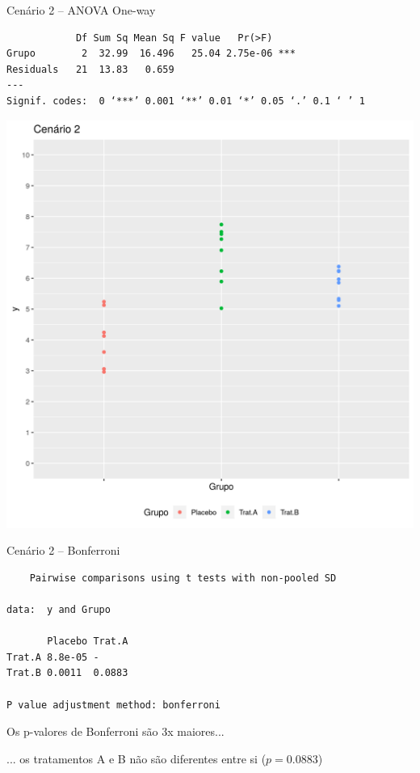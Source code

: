 \documentclass{beamer}
\begin{document}
\begin{frame}[fragile, label=cenario2-1way]
  \begin{exampleblock}{Cenário 2 -- ANOVA One-way}
    \tiny
\begin{verbatim}
            Df Sum Sq Mean Sq F value   Pr(>F)
Grupo        2  32.99  16.496   25.04 2.75e-06 ***
Residuals   21  13.83   0.659
---
Signif. codes:  0 ‘***’ 0.001 ‘**’ 0.01 ‘*’ 0.05 ‘.’ 0.1 ‘ ’ 1
\end{verbatim}
    \begin{center}
      \includegraphics[height=.5\textheight]{Cap13-30/cenario2}
    \end{center}
  \end{exampleblock}
\end{frame}


\begin{frame}[fragile]
  \begin{exampleblock}{Cenário 2 -- Bonferroni}
    \scriptsize
\begin{verbatim}
	Pairwise comparisons using t tests with non-pooled SD 

data:  y and Grupo 

       Placebo Trat.A
Trat.A 8.8e-05 -     
Trat.B 0.0011  0.0883

P value adjustment method: bonferroni
\end{verbatim}
  \end{exampleblock}
  \begin{block}{}
    \small
    Os p-valores de Bonferroni são 3x maiores...

    \bigskip
    ... os tratamentos A e B não são diferentes entre si ($p=0.0883$)
  \end{block}
\end{frame}
\end{document}
